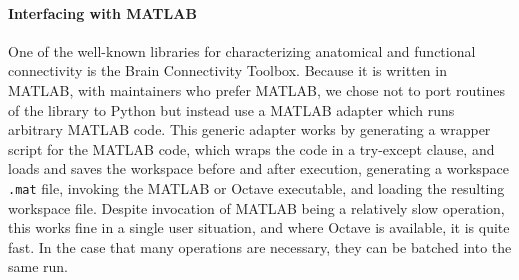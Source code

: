 \paragraph{Interfacing with MATLAB}

One of the well-known libraries for characterizing anatomical 
and functional connectivity is the Brain Connectivity Toolbox. Because
it is written in MATLAB, with maintainers who prefer MATLAB, we 
chose not to port routines of the library to Python but instead use
a MATLAB adapter which runs arbitrary MATLAB code. This generic
adapter works by generating a wrapper script for the MATLAB code, which
wraps the code in a try-except clause, and loads and saves the workspace
before and after execution, 
generating a workspace \texttt{.mat} file, invoking the MATLAB or Octave
executable, and loading the resulting workspace file. Despite invocation
of MATLAB being a relatively slow operation, this works fine in a single
user situation, and where Octave is available, it is quite fast. In the 
case that many operations are necessary, they can be batched into the 
same run.


